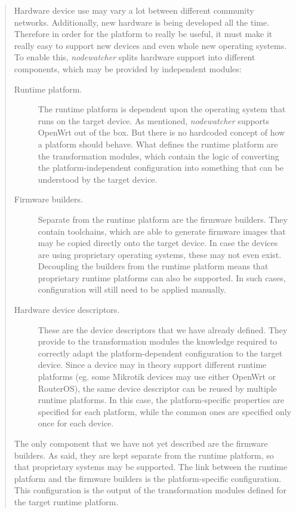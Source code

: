 \documentclass[12pt,twoside,a4paper]{report}
\newcommand{\nodewatcher}{\textit{nodewatcher}}
\begin{document}
\begin{quote}
Hardware device use may vary a lot between different community networks.
Additionally, new hardware is being developed all the time.
Therefore in order for the platform to really be useful, it must make it really easy to support new devices and even whole new operating systems.
To enable this, \nodewatcher{} splits hardware support into different components, which may be provided by independent modules:

\begin{description}
    \item[Runtime platform.] The runtime platform is dependent upon the operating system that runs on the target device.
    As mentioned, \nodewatcher{} supports OpenWrt out of the box.
    But there is no hardcoded concept of how a platform should behave.
    What defines the runtime platform are the transformation modules, which contain the logic of converting the platform-independent configuration into something that can be understood by the target device.

    \item[Firmware builders.] Separate from the runtime platform are the firmware builders.
    They contain toolchains, which are able to generate firmware images that may be copied directly onto the target device.
    In case the devices are using proprietary operating systems, these may not even exist.
    Decoupling the builders from the runtime platform means that proprietary runtime platforms can also be supported.
    In such cases, configuration will still need to be applied manually.

    \item[Hardware device descriptors.] These are the device descriptors that we have already defined.
    They provide to the transformation modules the knowledge required to correctly adapt the platform-dependent configuration to the target device.
    Since a device may in theory support different runtime platforms (eg. some Mikrotik devices may use either OpenWrt or RouterOS), the same device descriptor can be reused by multiple runtime platforms.
    In this case, the platform-specific properties are specified for each platform, while the common ones are specified only once for each device.
\end{description}

The only component that we have not yet described are the firmware builders.
As said, they are kept separate from the runtime platform, so that proprietary systems may be supported.
The link between the runtime platform and the firmware builders is the platform-specific configuration.
This configuration is the output of the transformation modules defined for the target runtime platform.


\end{quote}
\end{document}
